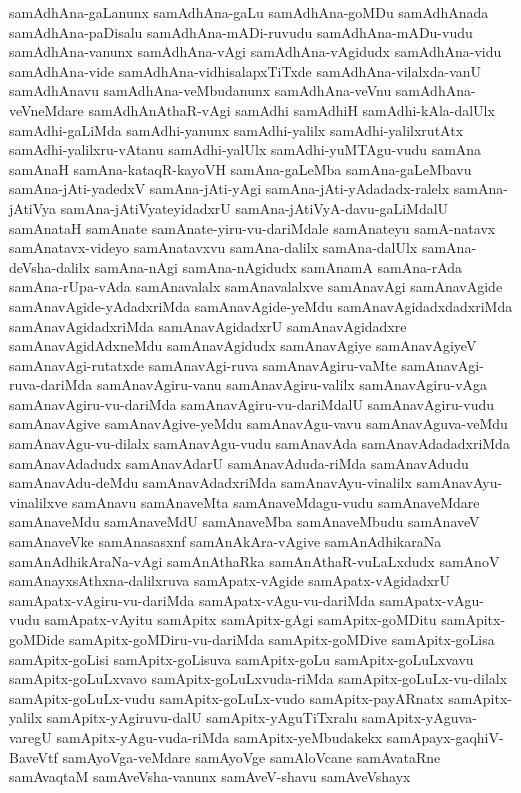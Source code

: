 {samAdhAna-gaLanunx
samAdhAna-gaLu
samAdhAna-goMDu
samAdhAnada
samAdhAna-paDisalu
samAdhAna-mADi-ruvudu
samAdhAna-mADu-vudu
samAdhAna-vanunx
samAdhAna-vAgi
samAdhAna-vAgidudx
samAdhAna-vidu
samAdhAna-vide
samAdhAna-vidhisalapxTiTxde
samAdhAna-vilalxda-vanU
samAdhAnavu
samAdhAna-veMbudanunx
samAdhAna-veVnu
samAdhAna-veVneMdare
samAdhAnAthaR-vAgi
samAdhi
samAdhiH
samAdhi-kAla-dalUlx
samAdhi-gaLiMda
samAdhi-yanunx
samAdhi-yalilx
samAdhi-yalilxrutAtx
samAdhi-yalilxru-vAtanu
samAdhi-yalUlx
samAdhi-yuMTAgu-vudu
samAna
samAnaH
samAna-kataqR-kayoVH
samAna-gaLeMba
samAna-gaLeMbavu
samAna-jAti-yadedxV
samAna-jAti-yAgi
samAna-jAti-yAdadadx-ralelx
samAna-jAtiVya
samAna-jAtiVyateyidadxrU
samAna-jAtiVyA-davu-gaLiMdalU
samAnataH
samAnate
samAnate-yiru-vu-dariMdale
samAnateyu
samA-natavx
samAnatavx-videyo
samAnatavxvu
samAna-dalilx
samAna-dalUlx
samAna-deVsha-dalilx
samAna-nAgi
samAna-nAgidudx
samAnamA
samAna-rAda
samAna-rUpa-vAda
samAnavalalx
samAnavalalxve
samAnavAgi
samAnavAgide
samAnavAgide-yAdadxriMda
samAnavAgide-yeMdu
samAnavAgidadxdadxriMda
samAnavAgidadxriMda
samAnavAgidadxrU
samAnavAgidadxre
samAnavAgidAdxneMdu
samAnavAgidudx
samAnavAgiye
samAnavAgiyeV
samAnavAgi-rutatxde
samAnavAgi-ruva
samAnavAgiru-vaMte
samAnavAgi-ruva-dariMda
samAnavAgiru-vanu
samAnavAgiru-valilx
samAnavAgiru-vAga
samAnavAgiru-vu-dariMda
samAnavAgiru-vu-dariMdalU
samAnavAgiru-vudu
samAnavAgive
samAnavAgive-yeMdu
samAnavAgu-vavu
samAnavAguva-veMdu
samAnavAgu-vu-dilalx
samAnavAgu-vudu
samAnavAda
samAnavAdadadxriMda
samAnavAdadudx
samAnavAdarU
samAnavAduda-riMda
samAnavAdudu
samAnavAdu-deMdu
samAnavAdadxriMda
samAnavAyu-vinalilx
samAnavAyu-vinalilxve
samAnavu
samAnaveMta
samAnaveMdagu-vudu
samAnaveMdare
samAnaveMdu
samAnaveMdU
samAnaveMba
samAnaveMbudu
samAnaveV
samAnaveVke
samAnasasxnf
samAnAkAra-vAgive
samAnAdhikaraNa
samAnAdhikAraNa-vAgi
samAnAthaRka
samAnAthaR-vuLaLxdudx
samAnoV
samAnayxsAthxna-dalilxruva
samApatx-vAgide
samApatx-vAgidadxrU
samApatx-vAgiru-vu-dariMda
samApatx-vAgu-vu-dariMda
samApatx-vAgu-vudu
samApatx-vAyitu
samApitx
samApitx-gAgi
samApitx-goMDitu
samApitx-goMDide
samApitx-goMDiru-vu-dariMda
samApitx-goMDive
samApitx-goLisa
samApitx-goLisi
samApitx-goLisuva
samApitx-goLu
samApitx-goLuLxvavu
samApitx-goLuLxvavo
samApitx-goLuLxvuda-riMda
samApitx-goLuLx-vu-dilalx
samApitx-goLuLx-vudu
samApitx-goLuLx-vudo
samApitx-payARnatx
samApitx-yalilx
samApitx-yAgiruvu-dalU
samApitx-yAguTiTxralu
samApitx-yAguva-varegU
samApitx-yAgu-vuda-riMda
samApitx-yeMbudakekx
samApayx-gaqhiV-BaveVtf
samAyoVga-veMdare
samAyoVge
samAloVcane
samAvataRne
samAvaqtaM
samAveVsha-vanunx
samAveV-shavu
samAveVshayx
}
